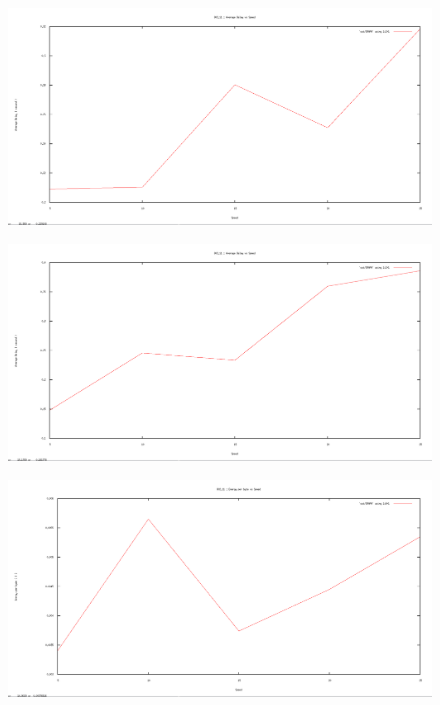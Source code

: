 \documentclass[12pt]{article}
\begin{document}
\begin{figure}[H]
	\centering
	\includegraphics[scale=	0.26]{image/bpics/bm_averagedelay_vs_speed.png}
\end{figure}

\begin{figure}[H]
	\centering
	\includegraphics[scale=	0.26]{image/apics/am_averagedelay_vs_speed.png}
\end{figure}

\begin{figure}[H]
	\centering
	\includegraphics[scale=	0.26]{image/bpics/temp.png}
\end{figure}
\end{document}
